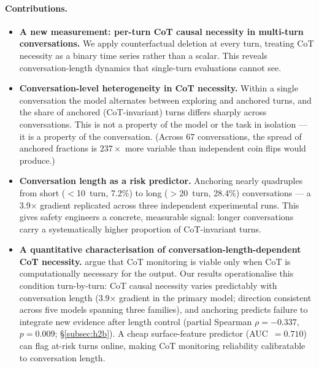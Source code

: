 \documentclass{article}
\begin{document}
\paragraph{Contributions.}
\begin{itemize}
  \item \textbf{A new measurement: per-turn CoT causal necessity in
        multi-turn conversations.}
        We apply counterfactual deletion at every turn, treating
        CoT necessity as a binary time series rather than a scalar.
        This reveals conversation-length dynamics that single-turn
        evaluations cannot see.
  \item \textbf{Conversation-level heterogeneity in CoT necessity.}
        Within a single conversation the model alternates between
        exploring and anchored turns, and the share of anchored
        (CoT-invariant) turns differs sharply across conversations.
        This is not a property of the model or the task in
        isolation --- it is a property of the conversation.
        (Across 67 conversations, the spread of anchored fractions
        is $237\times$ more variable than independent coin flips
        would produce.)
  \item \textbf{Conversation length as a risk predictor.}
        Anchoring nearly quadruples from short ($<$10~turn,
        7.2\%) to long ($>$20~turn, 28.4\%) conversations ---
        a 3.9$\times$ gradient replicated across three independent
        experimental runs.
        This gives safety engineers a concrete, measurable signal:
        longer conversations carry a systematically higher proportion
        of CoT-invariant turns.
  \item \textbf{A quantitative characterisation of conversation-length-dependent CoT necessity.}
        \citet{korbak2025} argue that CoT monitoring is viable
        only when CoT is computationally necessary for the output.
        Our results operationalise this condition turn-by-turn:
        CoT causal necessity varies predictably with conversation
        length (3.9$\times$ gradient in the primary model; direction
        consistent across five models spanning three families), and
        anchoring predicts failure to integrate new
        evidence after length control
        (partial Spearman $\rho=-0.337$, $p=0.009$;
        \S\ref{subsec:h2b}).
        A cheap surface-feature predictor (AUC~$=0.710$) can
        flag at-risk turns online, making CoT monitoring reliability
        calibratable to conversation length.
\end{itemize}
\end{document}
